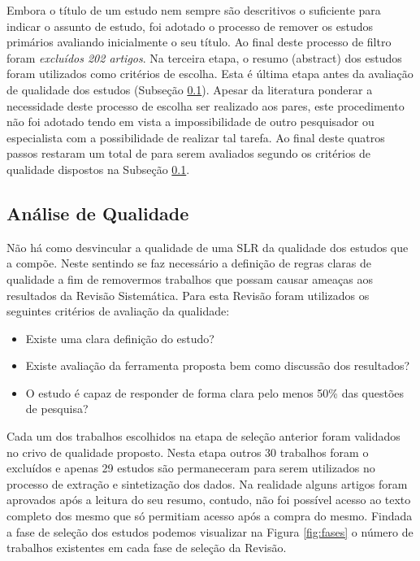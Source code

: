 \documentclass[12pt]{article}
\begin{document}
Embora o título de um estudo nem sempre são descritivos o suficiente para
indicar o assunto de estudo, foi adotado o processo de remover os estudos
primários avaliando inicialmente o seu título. Ao final deste processo de
filtro foram \textit{excluídos 202 artigos}. Na terceira etapa, o resumo
(abstract) dos estudos foram utilizados como critérios de escolha. Esta é
última etapa antes da avaliação de qualidade dos estudos (Subseção
\ref{subsec:analise-qualidade}). Apesar da literatura ponderar a necessidade
deste processo de escolha ser realizado aos pares, este procedimento não foi
adotado tendo em vista a impossibilidade de outro pesquisador ou especialista
com a possibilidade de realizar tal tarefa. Ao final deste quatros passos
restaram um total de para serem avaliados segundo os critérios de qualidade
dispostos na Subseção \ref{subsec:analise-qualidade}.

\subsection{Análise de Qualidade}
\label{subsec:analise-qualidade}
Não há como desvincular a qualidade de uma SLR da qualidade dos estudos que a
compõe. Neste sentindo se faz necessário a definição de regras claras de
qualidade a fim de removermos trabalhos que possam causar ameaças aos
resultados da Revisão Sistemática. Para esta Revisão foram utilizados os
seguintes critérios de avaliação da qualidade:

\begin{itemize}
\item Existe uma clara definição do estudo?
\item Existe avaliação da ferramenta proposta bem como discussão dos resultados?
\item O estudo é capaz de responder de forma clara pelo menos 50\% das questões
  de pesquisa?
\end{itemize}

Cada um dos trabalhos escolhidos na etapa de seleção anterior foram validados
no crivo de qualidade proposto. Nesta etapa outros 30
trabalhos foram o excluídos e apenas 29 estudos são permaneceram
para serem utilizados no processo de extração e sintetização dos dados. Na
realidade alguns artigos foram aprovados após a leitura do seu resumo, contudo,
não foi possível acesso ao texto completo dos mesmo que só permitiam acesso
após a compra do mesmo. Findada
a fase de seleção dos estudos podemos visualizar na  Figura \ref{fig:fases}
o número de trabalhos existentes em cada fase de seleção da Revisão.
\end{document}
